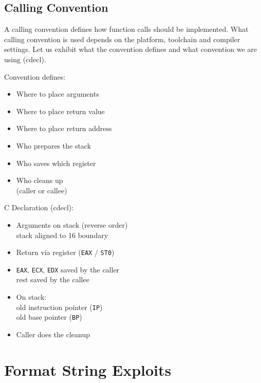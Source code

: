 \documentclass[article]{uibk}
\begin{document}
\subsection{Calling Convention}
\label{sub:calling_convention}

A calling convention defines how function calls should be implemented. What
calling convention is used depends on the platform, toolchain and compiler
settings. Let us exhibit what the convention defines and what convention we are
using (cdecl).

\begin{minipage}[t]{0.48\textwidth}
    Convention defines:
    \begin{itemize}
        \item Where to place arguments
        \item Where to place return value
        \item Where to place return address
        \item Who prepares the stack
        \item Who saves which register
        \item Who cleans up\\
            (caller or callee)
    \end{itemize}
\end{minipage}\hfill
\begin{minipage}[t]{0.48\textwidth}
    C Declaration (cdecl):
    \begin{itemize}
        \item Arguments on stack (reverse order)\\
            stack aligned to \SI{16}{\byte} boundary
        \item Return via register (\texttt{EAX} / \texttt{ST0})
        \item \texttt{EAX}, \texttt{ECX}, \texttt{EDX} saved by the caller\\
            rest saved by the callee
        \item On stack:\\
            old instruction pointer (\texttt{IP})\\
            old base pointer (\texttt{BP})
        \item Caller does the cleanup
    \end{itemize}
\end{minipage}

\section{Format String Exploits}
\label{sec:format_string_exploit}
\end{document}
